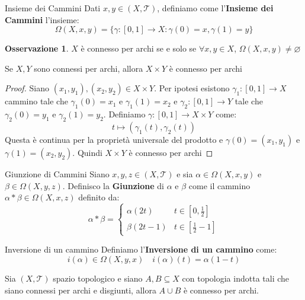 \documentclass[11pt,a4paper,twoside]{article}
\theoremstyle{definition}
\newtheorem*{oss}{Osservazione}
\begin{document}
\begin{defn}{Insieme dei Cammini}{}
	Dati $x,y \in (X, \mathcal T)$, definiamo come l'\textbf{Insieme dei Cammini} l'insieme:
	\[ \Omega(X, x, y) = \{\gamma:[0,1] \to X: \gamma(0) = x, \gamma(1) = y\} \]
\end{defn}

\begin{oss}
	$X$ è connesso per archi se e solo se $\forall x, y \in X$, $\Omega(X, x, y) \neq \varnothing$
\end{oss}

\begin{prop}{}{}
	Se $X, Y$ sono connessi per archi, allora $X \times Y$ è connesso per archi
\end{prop}

\begin{proof}
	Siano $(x_1,y_1), (x_2,y_2) \in X \times Y$. Per ipotesi esistono $\gamma_1:[0,1] \to X$ cammino tale che $\gamma_1(0) = x_1$ e $\gamma_1(1) =x_2$ e $\gamma_2:[0,1] \to Y$ tale che $\gamma_2(0) = y_1$ e $\gamma_2(1) = y_2$. Definiamo $\gamma:[0,1] \to X \times Y$ come:
	\[ t \mapsto (\gamma_1(t), \gamma_2(t)) \]
	Questa è continua per la proprietà universale del prodotto e $\gamma(0) = (x_1, y_1)$ e $\gamma(1) = (x_2,y_2)$. Quindi $X \times Y$ è connesso per archi
\end{proof}

\begin{defn}{Giunzione di Cammini}{}
	Siano $x, y, z \in (X, \mathcal T)$ e sia $\alpha \in \Omega(X,x,y)$ e $\beta \in \Omega(X, y,z)$. Definisco la \textbf{Giunzione} di $\alpha$ e $\beta$ come il cammino $\alpha * \beta \in \Omega(X, x, z)$ definito da:
	\[\alpha* \beta = \begin{cases} \alpha(2t) & t \in [0, \frac 12]\\ \beta(2t-1) & t \in [\frac 12 -1 ] \end{cases}\]
\end{defn}

\begin{defn}{Inversione di un cammino}{}
	Definiamo l'\textbf{Inversione di un cammino} come:
	\[ i(\alpha) \in \Omega(X, y, x)\quad i(\alpha)(t) = \alpha(1-t) \]
\end{defn}

\begin{prop}{}{}
	Sia $(X, \mathcal T)$ spazio topologico e siano $A, B \subseteq X$ con topologia indotta tali che siano connessi per archi e disgiunti, allora $A\cup B$ è connesso per archi.
\end{prop}
\end{document}
